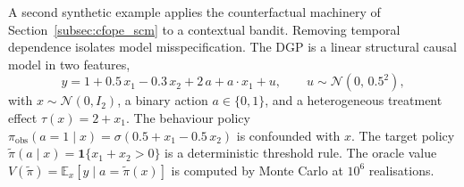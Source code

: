 A second synthetic example applies the counterfactual machinery of Section~\ref{subsec:cfope_scm} to a contextual bandit. Removing temporal dependence isolates model misspecification. The DGP is a linear structural causal model in two features,
\begin{equation}
y = 1 + 0.5\, x_1 - 0.3\, x_2 + 2\, a + a \cdot x_1 + u,
\qquad u \sim \mathcal N(0,\, 0.5^2),
\label{eq:cfope_dgp}
\end{equation}
with $x \sim \mathcal N(0, I_2)$, a binary action $a \in \{0, 1\}$, and a heterogeneous treatment effect $\tau(x) = 2 + x_1$. The behaviour policy $\pi_{\mathrm{obs}}(a = 1 \mid x) = \sigma(0.5 + x_1 - 0.5\, x_2)$ is confounded with $x$. The target policy $\widetilde\pi(a \mid x) = \mathbf 1\{x_1 + x_2 > 0\}$ is a deterministic threshold rule. The oracle value $V(\widetilde\pi) = \mathbb E_x[y \mid a = \widetilde\pi(x)]$ is computed by Monte Carlo at $10^6$ realisations.

